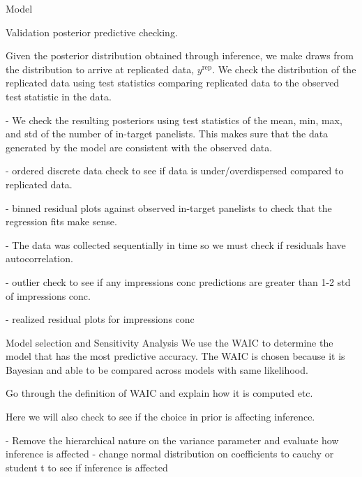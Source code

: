 \begin{chapter}{Model}
\begin{section}{Validation}
  posterior predictive checking.

  Given the posterior distribution obtained through inference, we make draws
  from the distribution to arrive at replicated data, $y^{\text{rep}}$. We check
  the distribution of the replicated data using test statistics comparing replicated data to the observed
  test statistic in the data.

  - We check the resulting posteriors using test statistics
  of the mean, min, max, and std of the number of in-target panelists. This makes
  sure that the data generated by the model are consistent with the observed data.

  - ordered discrete data check to see if data is under/overdispersed compared to replicated data.

  - binned residual plots against observed in-target panelists to check that the
  regression fits make sense.

  - The data was collected sequentially in time so we must check if residuals
  have autocorrelation.

  - outlier check to see if any impressions conc predictions are greater than 1-2 std of impressions conc.

  - realized residual plots for impressions conc
\end{section}

\begin{section}{Model selection and Sensitivity Analysis}
  We use the WAIC to determine the model that has the most predictive accuracy.
  The WAIC is chosen because it is Bayesian and able to be compared across models
  with same likelihood.

  Go through the definition of WAIC and explain how it is computed etc.

  Here we will also check to see if the choice in prior is affecting inference.

  - Remove the hierarchical nature on the variance parameter and evaluate how inference is affected
  - change normal distribution on coefficients to cauchy or student t to see if inference is affected
\end{section}

\end{chapter}